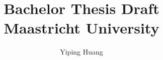 \documentclass[12pt]{article}
\begin{document}
\title{
{Bachelor Thesis Draft}\\
{\large Maastricht University}\\
}
\author{Yiping Huang}

\maketitle





\tableofcontents




%         
%     
\end{document}
